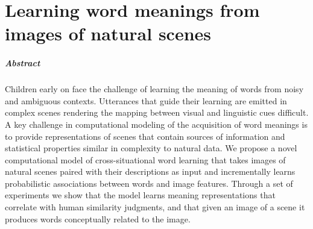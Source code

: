 





\chapter{Learning word meanings from images of natural scenes}
\label{TAL}



\paragraph{Abstract}Children early on face
the challenge of learning the meaning of words
from noisy and ambiguous contexts.
Utterances that guide their learning are
emitted in complex scenes rendering the mapping between
visual and linguistic cues difficult. A key challenge in computational
modeling of the acquisition of word meanings is
to provide representations of scenes that
contain sources of information and statistical properties
similar in complexity to natural data. We propose a novel
computational model of cross-situational word learning
that takes images of natural scenes paired with
their descriptions as input and incrementally learns
probabilistic associations between words and image features.
Through a set of experiments we show
that the model learns meaning representations that correlate with human similarity
judgments, and that given
an image of a scene it produces words conceptually related to the image.

\newpage

